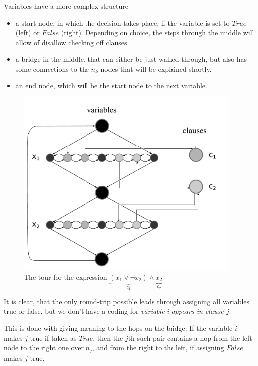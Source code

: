 Variables have a more complex structure

\begin{itemize}
	\item a start node, in which the decision takes place, if the variable is 
		set to $True$ (left) or $False$ (right). Depending on choice, the steps 
		through the middle will allow of disallow checking off clauses.
	\item a bridge in the middle, that can either be just walked through, but 
		also has some connections to the $n_k$ nodes that will be explained shortly.
	\item an end node, which will be the start node to the next variable.
\end{itemize}

\begin{figure}[htb]
	\includegraphics[width=0.97\textwidth]{complexity/langcomplexity/pictures/satastsp}
	\caption{The tour for the expression $\underbrace{(x_1\vee\lnot x_2)}_{c_1}\wedge \underbrace{x_2}_{c_2}$}
	
\end{figure}

It is clear, that the only 
round-trip possible leads through assigning all variables true or false, but 
we don't have a coding for \emph{variable $i$ appears in clause $j$}. 

This is done with giving meaning to the hops on the bridge: If the variable 
$i$ makes $j$ true if taken as $True$, then the $j$th such pair contains 
a hop from the left node to the right one over $n_j$, and from the right to 
the left, if assigning $False$ makes $j$ true.

